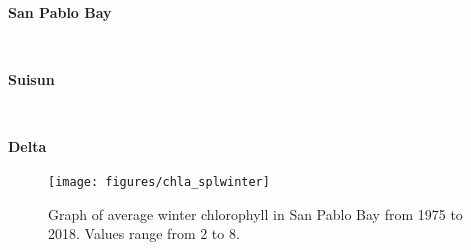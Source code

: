 \documentclass[
]{book}
\begin{document}
\begin{panel-grid}

\begin{columns-nocenter}

\begin{column800}

\textbf{San Pablo Bay}

\end{column800}

\begin{column40}

~

\end{column40}

\begin{column800}

\textbf{Suisun}

\end{column800}

\begin{column40}

~

\end{column40}

\begin{column800}

\textbf{Delta}

\end{column800}

\end{columns-nocenter}

\begin{columns-nocenter}

\begin{column800}

\begin{expand}

\begin{figure}
\texttt{[image: figures/chla\_splwinter]} \caption{Graph of average winter chlorophyll in San Pablo Bay from 1975 to 2018. Values range from 2 to 8.}\label{fig:unnamed-chunk-158}
\end{figure}

\end{expand}

\end{column800}

\begin{column40}

~

\end{column40}


\end{columns-nocenter}
\end{panel-grid}
\end{document}
